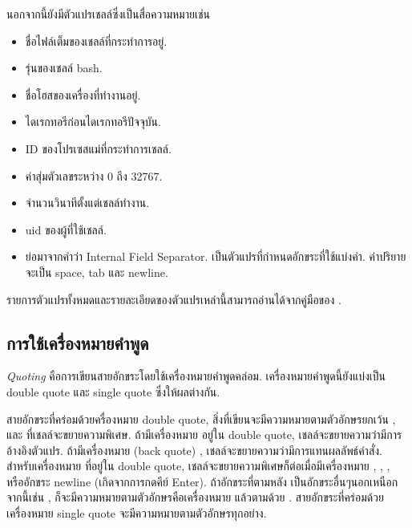 \begin{thwbr}
นอกจากนี้ยังมีตัวแปรเชลล์ซึ่งเป็นสื่อความหมายเช่น
\begin{itemize}
\item {} ชื่อไฟล์เต็มของเชลล์ที่กระทำการอยู่.
\item {} รุ่นของเชลล์ bash.
\item {} ชื่อโฮสของเครื่องที่ทำงานอยู่.
\item {} ไดเรกทอรีก่อนไดเรกทอรีปัจจุบัน.
\item {} ID ของโปรเซสแม่ที่กระทำการเชลล์.
\item {} ค่าสุ่มตัวเลขระหว่าง 0 ถึง 32767.
\item {} จำนวนวินาทีตั้งแต่เชลล์ทำงาน.
\item {} uid ของผู้ที่ใช้เชลล์.
\item {} ย่อมาจากคำว่า Internal Field Separator. เป็นตัวแปรที่กำหนดอักขระที่ใช้แบ่งคำ. ค่าปริยายจะเป็น space, tab และ newline.
\end{itemize}
รายการตัวแปรทั้งหมดและรายละเอียดของตัวแปรเหล่านี้สามารถอ่านได้จากคู่มือของ .

\subsection{การใช้เครื่องหมายคำพูด}
\emph{Quoting} คือการเขียนสายอักขระโดยใช้เครื่องหมายคำพูดคล่อม. เครื่องหมายคำพูดนี้ยังแบ่งเป็น double quote และ single quote ซึ่งให้ผลต่างกัน.

สายอักขระที่คร่อมด้วยครื่องหมาย double quote, สิ่งที่เขียนจะมีความหมายตามตัวอักษรยกเว้น \cmd{\$},  และ \cmd{\bs} ที่เชลล์จะขยายความพิเศษ. ถ้ามีเครื่องหมาย \cmd{\$} อยู่ใน double quote, เชลล์จะขยายความว่ามีการอ้างอิงตัวแปร. ถ้ามีเครื่องหมาย  (back quote) , เชลล์จะขยายความว่ามีการแทนผลลัพธ์คำสั่ง. สำหรับเครื่องหมาย \cmd{\bs} ที่อยู่ใน double quote, เชลล์จะขยายความพิเศษก็ต่อเมื่อมีเครื่องหมาย \cmd{\$}, , , \cmd{\bs} หรืออักขระ newline (เกิดจากการกดคีย์ Enter). ถ้าอักขระที่ตามหลัง \cmd{\bs} เป็นอักขระอื่นๆนอกเหนือกจากนี้เช่น , ก็จะมีความหมายตามตัวอักษรคือเครื่องหมาย \cmd{\bs} แล้วตามด้วย . สายอักขระที่คร่อมด้วยเครื่องหมาย single quote จะมีความหมายตามตัวอักษรทุกอย่าง.

\begin{MyExample}
\end{MyExample}%


\end{thwbr}
